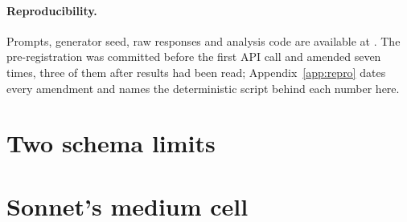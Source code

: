 \ifsubmission\else\fi

\paragraph{Reproducibility.} Prompts, generator seed, raw responses and analysis code are available at
\repourl. The pre-registration was committed before the first API call and
amended seven times, three of them after results had been read;
Appendix~\ref{app:repro} dates every amendment and names the deterministic
script behind each number here.

\label{xbodyend}
\par{}
\makeatletter{}\makeatother
\ifsubmission\fi


\ifsubmission\else\fi


\appendix

\ifsubmission
\section{Two schema limits}


\section{Sonnet's medium cell}


